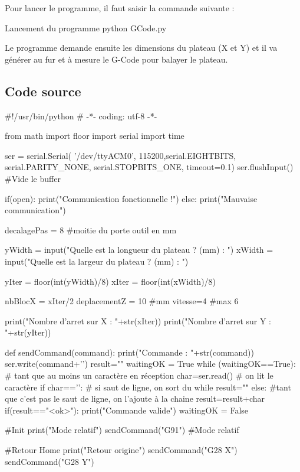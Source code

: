 

Pour lancer le programme, il faut saisir la commande suivante : 
\begin{Bash}{Lancement du programme}
python GCode.py
\end{Bash}

Le programme demande ensuite les dimensions du plateau (X et Y) et il va générer au fur et à mesure le G-Code pour balayer le plateau.

\subsection{Code source}

\begin{Python}
#!/usr/bin/python
# -*- coding: utf-8 -*-

from math import floor
import serial
import time

ser = serial.Serial( '/dev/ttyACM0', 115200,serial.EIGHTBITS, serial.PARITY_NONE, serial.STOPBITS_ONE, timeout=0.1)
ser.flushInput()  #Vide le buffer

if(open):
    print("Communication fonctionnelle !")
else:
    print("Mauvaise communication")

decalagePas = 8 #moitie du porte outil en mm

yWidth = input("Quelle est la longueur du plateau ? (mm) : ")
xWidth = input("Quelle est la largeur du plateau ? (mm) : ")

yIter = floor(int(yWidth)/8)
xIter = floor(int(xWidth)/8)

nbBlocX = xIter/2
deplacementZ = 10 #mm
vitesse=4 #max 6

print("Nombre d'arret sur X : "+str(xIter))
print("Nombre d'arret sur Y : "+str(yIter))

def sendCommand(command):
    print("Commande : "+str(command))
    ser.write(command+'\n')
    result=""
    waitingOK = True
    while (waitingOK==True): # tant que au moins un caractère en réception
        char=ser.read() # on lit le caractère
        if char=='\n': # si saut de ligne, on sort du while
            result=""
        else: #tant que c'est pas le saut de ligne, on l'ajoute à la chaine 
            result=result+char	
            if(result=="<ok>"):
                print("Commande valide")
                waitingOK = False


#Init
print("Mode relatif")
sendCommand("G91") #Mode relatif

#Retour Home
print("Retour origine")
sendCommand("G28 X")
sendCommand("G28 Y")



\end{Python}
